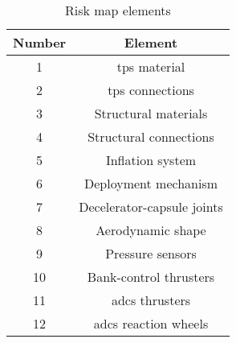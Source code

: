 \begin{table}[h]
	\centering
	\caption{Risk map elements}
	\label{tab:riskmapelements}
	\begin{tabular}{|c|c|}
		\hline 
		\textbf{Number} & \textbf{Element} \\ \hline \hline
		1 & \acrlong{tps} material \\
		2 & \acrlong{tps} connections\\
		3 & Structural materials\\
		4 & Structural connections\\
		5 & Inflation system \\	
		6 & Deployment mechanism\\
		7 & Decelerator-capsule joints\\
		8 & Aerodynamic shape\\
		9 & Pressure sensors\\
		10 & Bank-control thrusters\\
		11 & \gls{adcs} thrusters\\
		12 & \gls{adcs} reaction wheels\\
		\hline
	\end{tabular}
\end{table}


